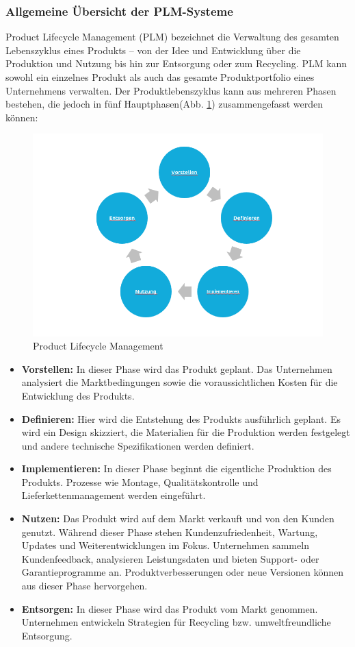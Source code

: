 \documentclass[a4paper, 12pt]{scrartcl}
\begin{document}
	\subsubsection{Allgemeine Übersicht der PLM-Systeme}
	Product Lifecycle Management (PLM) bezeichnet die Verwaltung des gesamten Lebenszyklus eines Produkts – von der Idee und Entwicklung über die Produktion und Nutzung bis hin zur Entsorgung oder zum Recycling. PLM kann sowohl ein einzelnes Produkt als auch das gesamte Produktportfolio eines Unternehmens verwalten\cite{stark2011product}.
	\newline
	Der Produktlebenszyklus kann aus mehreren Phasen bestehen, die jedoch in fünf Hauptphasen(Abb. \ref{PLM}) zusammengefasst werden können:
	\begin{figure}[h!]
		\begin{center}
			\includegraphics[width=12cm]{PLM.png}
			\caption{ Product Lifecycle Management}
			\label{PLM}
		\end{center}
	\end{figure}
	\begin{itemize}
		\item \textbf{Vorstellen:} In dieser Phase wird das Produkt geplant. Das Unternehmen analysiert die Marktbedingungen sowie die voraussichtlichen Kosten für die Entwicklung des Produkts.
		\item \textbf{Definieren:} Hier wird die Entstehung des Produkts ausführlich geplant. Es wird ein Design skizziert, die Materialien für die Produktion werden festgelegt und andere technische Spezifikationen werden definiert.
		\item \textbf{Implementieren:} In dieser Phase beginnt die eigentliche Produktion des Produkts. Prozesse wie Montage, Qualitätskontrolle und Lieferkettenmanagement werden eingeführt.
		\item \textbf{Nutzen:} Das Produkt wird auf dem Markt verkauft und von den Kunden genutzt. Während dieser Phase stehen Kundenzufriedenheit, Wartung, Updates und Weiterentwicklungen im Fokus. Unternehmen sammeln Kundenfeedback, analysieren Leistungsdaten und bieten Support- oder Garantieprogramme an. Produktverbesserungen oder neue Versionen können aus dieser Phase hervorgehen.
		\item \textbf{Entsorgen:} In dieser Phase wird das Produkt vom Markt genommen. Unternehmen entwickeln Strategien für Recycling bzw. umweltfreundliche Entsorgung.
	\end{itemize}
\end{document}
